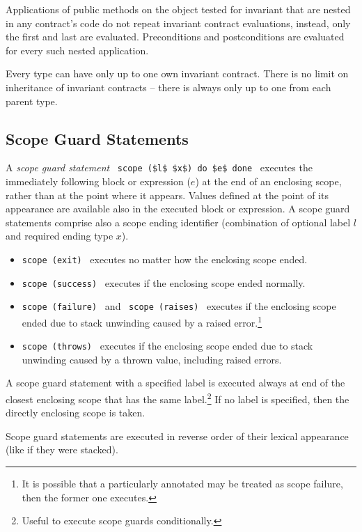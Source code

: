 Applications of public methods on the object tested for invariant that are nested in any contract's code do not repeat invariant contract evaluations, instead, only the first and last are evaluated. Preconditions and postconditions are evaluated for every such nested application. 

Every type can have only up to one own invariant contract. There is no limit on inheritance of invariant contracts -- there is always only up to one from each parent type. 





\subsection{Scope Guard Statements}

A {\em scope guard statement} ~\lstinline!scope ($l$ $x$) do $e$ done!~ executes the immediately following block or expression ($e$) at the end of an enclosing scope, rather than at the point where it appears. Values defined at the point of its appearance are available also in the executed block or expression. A scope guard statements comprise also a scope ending identifier (combination of optional label $l$ and required ending type $x$). 

\begin{itemize}
  \item \lstinline!scope (exit)!~ executes no matter how the enclosing scope ended. 
  \item \lstinline!scope (success)!~ executes if the enclosing scope ended normally. 
  \item \lstinline!scope (failure)!~ and ~\lstinline!scope (raises)!~ executes if the enclosing scope ended due to stack unwinding caused by a raised error.\footnote{It is possible that a particularly annotated  may be treated as scope failure, then the former one executes.}
  \item \lstinline!scope (throws)!~ executes if the enclosing scope ended due to stack unwinding caused by a thrown value, including raised errors.
\end{itemize}

A scope guard statement with a specified label is executed always at end of the closest enclosing scope that has the same label.\footnote{Useful to execute scope guards conditionally.} If no label is specified, then the directly enclosing scope is taken. 

Scope guard statements are executed in reverse order of their lexical appearance (like if they were stacked). 

